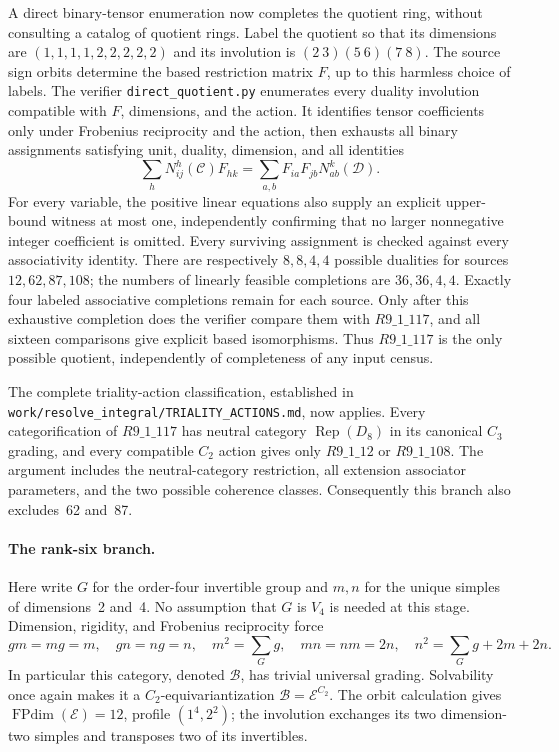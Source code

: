 A direct binary-tensor enumeration now completes the quotient ring,
without consulting a catalog of quotient rings. Label the quotient so that
its dimensions are $(1,1,1,1,2,2,2,2,2)$ and its involution is
$(2\ 3)(5\ 6)(7\ 8)$. The source sign orbits determine the based
restriction matrix $F$, up to this harmless choice of labels.
The verifier \nolinkurl{direct_quotient.py} enumerates every duality involution
compatible with $F$, dimensions, and the action. It identifies tensor
coefficients only under Frobenius reciprocity and the action, then
exhausts all binary assignments satisfying unit, duality, dimension, and
all identities
\[
 \sum_h N_{ij}^{h}(\mathcal C) F_{hk}
 =\sum_{a,b}F_{ia}F_{jb}N_{ab}^{k}(\mathcal D).
\]
For every variable, the positive linear equations also supply an explicit
upper-bound witness at most one, independently confirming that no larger
nonnegative integer coefficient is omitted. Every surviving assignment
is checked against every associativity identity.
There are respectively $8,8,4,4$ possible dualities for sources
$12,62,87,108$; the numbers of linearly feasible completions are
$36,36,4,4$. Exactly four labeled associative completions remain for
each source. Only after this exhaustive completion does the verifier
compare them with $R9\_1\_117$, and all sixteen comparisons give explicit
based isomorphisms. Thus $R9\_1\_117$ is the only possible quotient,
independently of completeness of any input census.

The complete triality-action classification, established in
\nolinkurl{work/resolve_integral/TRIALITY_ACTIONS.md}, now applies.
Every categorification of $R9\_1\_117$ has neutral category
$\operatorname{Rep}(D_8)$ in its canonical $C_3$ grading, and every compatible
$C_2$ action gives only $R9\_1\_12$ or $R9\_1\_108$.
The argument includes the neutral-category restriction, all extension
associator parameters, and the two possible coherence classes.
Consequently this branch also excludes~62 and~87.

\paragraph{The rank-six branch.}
Here write $G$ for the order-four invertible group and $m,n$ for the
unique simples of dimensions~2 and~4. No assumption that $G$ is $V_4$ is
needed at this stage. Dimension, rigidity, and Frobenius reciprocity force
\[
 gm=mg=m,\quad gn=ng=n,\quad
 m^2=\sum_G g,\quad mn=nm=2n,\quad
 n^2=\sum_G g+2m+2n.
\]
In particular this category, denoted $\mathcal B$, has trivial universal
grading. Solvability once again makes it a $C_2$-equivariantization
$\mathcal B=\mathcal E^{C_2}$. The orbit calculation gives
$\operatorname{FPdim}(\mathcal E)=12$, profile $(1^4,2^2)$; the involution
exchanges its two dimension-two simples and transposes two of its
invertibles.

